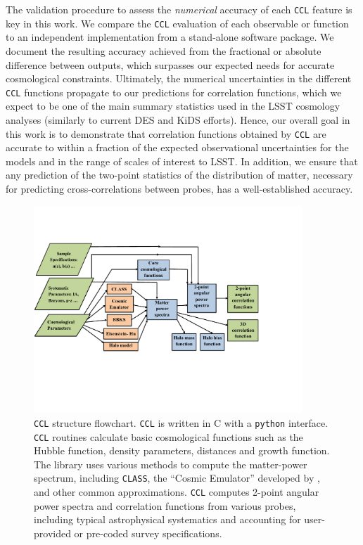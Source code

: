 \documentclass[\docopts]{\docclass}
\newcommand{\ccl}{{\tt CCL}\xspace}
\newcommand{\class}{{\tt CLASS}\xspace}
\begin{document}
The validation procedure to assess the {\it numerical} accuracy of each \ccl feature is key in this work. We compare the \ccl evaluation of each observable or function to an independent implementation from a stand-alone software package. We document the resulting accuracy achieved from the fractional or absolute difference between outputs, which surpasses our expected needs for accurate cosmological constraints. Ultimately, the numerical uncertainties in the different \ccl functions propagate to our predictions for correlation functions, which we expect to be one of the main summary statistics used in the LSST cosmology analyses (similarly to current DES and KiDS efforts). Hence, our overall goal in this work is to demonstrate that correlation functions obtained by \ccl are accurate to within a fraction of the expected observational uncertainties for the models and in the range of scales of interest to LSST. In addition, we ensure that any prediction of the two-point statistics of the distribution of matter, necessary for predicting cross-correlations between probes, has a well-established accuracy.

\begin{figure}
\centering
\includegraphics[width=0.9\textwidth]{CCL_Flowchart5}
\caption{\ccl structure flowchart. \ccl is written in C with a {\tt python} interface. \ccl routines calculate basic cosmological functions such as the Hubble function, density parameters, distances and growth function. The library uses various methods to compute the matter-power spectrum, including \class, the ``Cosmic Emulator'' developed by \citet{Lawrence17}, and other common approximations. \ccl computes 2-point angular power spectra and correlation functions from various probes, including typical astrophysical systematics and accounting for user-provided or pre-coded survey specifications.}
\label{fig:CCL_structure}
\end{figure}
\end{document}
